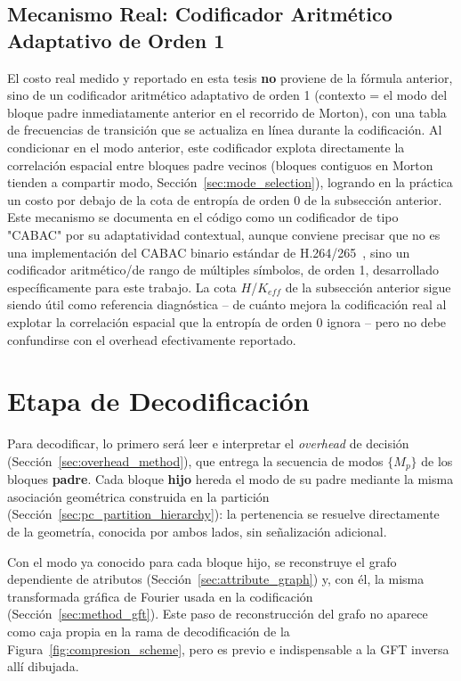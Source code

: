 \subsection{Mecanismo Real: Codificador Aritmético Adaptativo de Orden 1}

El costo real medido y reportado en esta tesis \textbf{no} proviene de la fórmula anterior, sino
de un codificador aritmético adaptativo de orden 1 (contexto = el modo del bloque padre
inmediatamente anterior en el recorrido de Morton), con una tabla de frecuencias de transición
que se actualiza en línea durante la codificación. Al condicionar en el modo anterior, este
codificador explota directamente la correlación espacial entre bloques padre vecinos (bloques
contiguos en Morton tienden a compartir modo, Sección~\ref{sec:mode_selection}), logrando en la
práctica un costo por debajo de la cota de entropía de orden 0 de la subsección anterior. Este
mecanismo se documenta en el código como un codificador de tipo "CABAC" por su adaptatividad
contextual, aunque conviene precisar que no es una implementación del CABAC binario estándar de H.264/265~\cite{marpe2003cabac}, sino un codificador aritmético/de rango de múltiples símbolos, de orden 1,
desarrollado específicamente para este trabajo. La cota $H$/$K_{eff}$ de la subsección anterior
sigue siendo útil como referencia diagnóstica -- de cuánto mejora la codificación real al
explotar la correlación espacial que la entropía de orden 0 ignora -- pero no debe confundirse
con el overhead efectivamente reportado.

\section{Etapa de Decodificación}\label{sec:decode_method}
   Para decodificar, lo primero será leer e interpretar el \textit{overhead} de decisión
   (Sección~\ref{sec:overhead_method}), que entrega la secuencia de modos $\{M_p\}$ de los
   bloques \textbf{padre}. Cada bloque \textbf{hijo} hereda el modo de su padre mediante la
   misma asociación geométrica construida en la partición
   (Sección~\ref{sec:pc_partition_hierarchy}): la pertenencia se resuelve directamente de la
   geometría, conocida por ambos lados, sin señalización adicional.

   Con el modo ya conocido para cada bloque hijo, se reconstruye el grafo dependiente de
   atributos (Sección~\ref{sec:attribute_graph}) y, con él, la misma transformada gráfica de
   Fourier usada en la codificación (Sección~\ref{sec:method_gft}). Este paso de reconstrucción del grafo no aparece como caja propia en la rama de decodificación de la Figura~\ref{fig:compresion_scheme}, pero es previo e indispensable a la GFT inversa allí dibujada.

